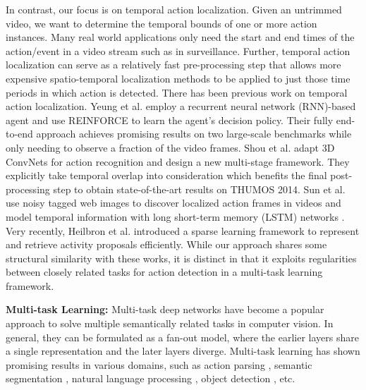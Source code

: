 \documentclass[10pt,twocolumn,letterpaper]{article}
\begin{document}
In contrast, our focus is on temporal action localization. Given an untrimmed video, we want to determine the temporal bounds of one or more action instances. Many real world applications only need the start and end times of the action/event in a video stream such as in surveillance. Further, temporal action localization can serve as a relatively fast pre-processing step that allows more expensive spatio-temporal localization methods to be applied to just those time periods in which action is detected. 
There has been previous work on temporal action localization.
Yeung et al. \cite{frame_glimpse_yeung_cvpr16} employ a recurrent neural network (RNN)-based agent and use REINFORCE \cite{REINFORCE_1992} to learn the agent's decision policy. Their fully end-to-end approach achieves promising results on two large-scale benchmarks while only needing to observe a fraction of the video frames.
Shou et al. \cite{scnn_shou_wang_chang_cvpr16} adapt 3D ConvNets \cite{c3d2015} for action recognition and design a new multi-stage framework. 
They explicitly take temporal overlap into consideration which benefits the final post-processing step to obtain state-of-the-art results on THUMOS 2014.
Sun et al. \cite{FGA_web_sun_mm15} use noisy tagged web images to discover localized action frames in videos and model temporal information with long short-term memory (LSTM) networks \cite{LSTM_1997}.
Very recently, Heilbron et al. \cite{fast_temporal_action_proposal_fabian_cvpr16} introduced a sparse learning framework to represent and retrieve activity proposals efficiently. 
While our approach shares some structural similarity with these works, it is distinct in that it exploits regularities between closely related tasks for action detection in a multi-task learning framework.

\noindent \textbf{Multi-task Learning:} Multi-task deep networks have become a popular approach to solve multiple semantically related tasks in computer vision. In general, they can be formulated as a fan-out model, where the earlier layers share a single representation and the later layers diverge. 
Multi-task learning has shown promising results in various domains, such as action parsing \cite{DAP3D2016}, semantic segmentation \cite{segment_multitask_cvpr16_dai}, natural language processing \cite{seq2seq_multitask_iclr16_luong}, object detection \cite{object_multitask_iccv15_ghifary}, etc.
\end{document}

